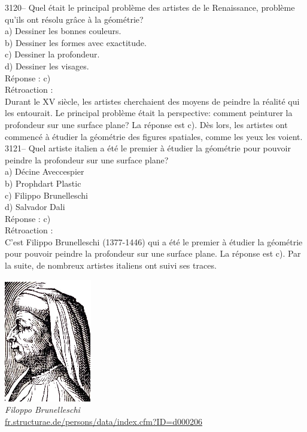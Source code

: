 \documentclass[letterpaper, 12pt]{article}
\begin{document}
3120-- Quel \'etait le principal probl\`eme des artistes de le Renaissance, probl\`eme qu'ils ont r\'esolu gr\^ace \`a la g\'eom\'etrie?\\

a) Dessiner les bonnes couleurs.\\
b) Dessiner les formes avec exactitude.\\
c) Dessiner la profondeur.\\
d) Dessiner les visages.\\

R\'eponse : c)\\

R\'etroaction :\\
Durant le {\scriptsize XV\ieme} si\`ecle, les artistes cherchaient des moyens de peindre la r\'ealit\'e qui les entourait. Le principal probl\`eme \'etait la perspective: comment peinturer la profondeur sur une surface plane? La r\'eponse est c). D\`es lors, les artistes ont commenc\'e \`a \'etudier la g\'eom\'etrie des figures spatiales, comme les yeux les voient.\\



3121-- Quel artiste italien a \'et\'e le premier \`a \'etudier la g\'eom\'etrie pour pouvoir peindre la profondeur sur une surface plane?\\

a) D\'ecine Aveccespier\\
b) Prophdart Plastic\\
c) Filippo Brunelleschi\\
d) Salvador Dali\\

R\'eponse : c)\\

R\'etroaction :\\
C'est Filippo Brunelleschi (1377-1446) qui a \'et\'e le premier \`a \'etudier la g\'eom\'etrie pour pouvoir peindre la profondeur sur une surface plane. La r\'eponse est c). Par la suite, de nombreux artistes italiens ont suivi ses traces.\\
\begin{center}
\includegraphics[scale=1.3]{brunelleschi.eps}\\
\emph{{\small Filoppo Brunelleschi}}\\
\href{http://fr.structurae.de/persons/data/index.cfm?ID=d000206}{fr.structurae.de/persons/data/index.cfm?ID=d000206}\\[5mm]
\end{center}
\end{document}
